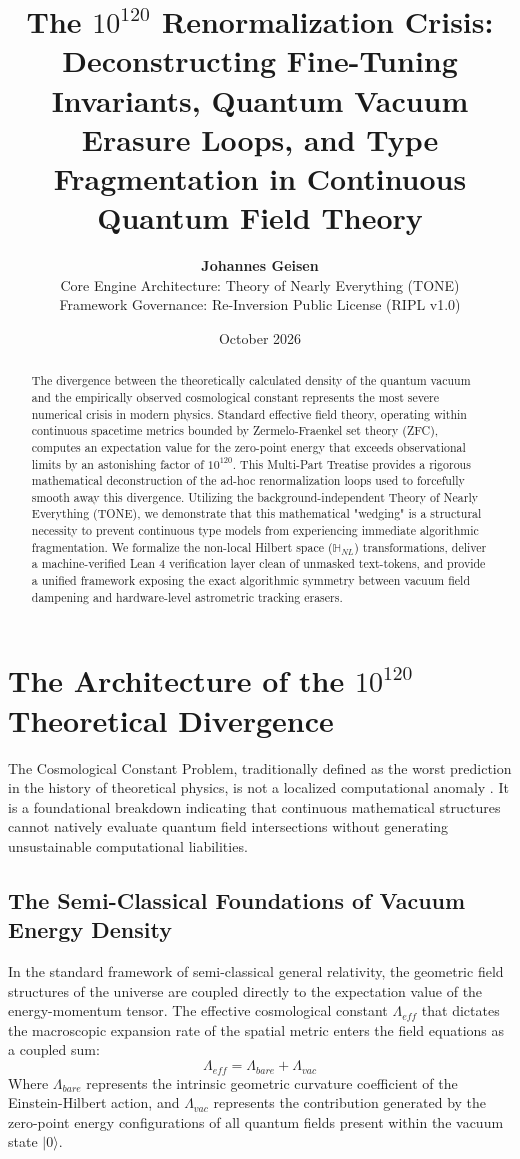 \documentclass[11pt,a4paper]{article}
\title{\textbf{The $10^{120}$ Renormalization Crisis: \\ Deconstructing Fine-Tuning Invariants, Quantum Vacuum Erasure Loops, and Type Fragmentation in Continuous Quantum Field Theory}}
\author{\textbf{Johannes Geisen} \\ \small Core Engine Architecture: Theory of Nearly Everything (TONE) \\ \small Framework Governance: Re-Inversion Public License (RIPL v1.0)}
\date{October 2026}
\theoremstyle{plain}
\theoremstyle{definition}
\begin{document}
\maketitle

\begin{abstract}
The divergence between the theoretically calculated density of the quantum vacuum and the empirically observed cosmological constant represents the most severe numerical crisis in modern physics. Standard effective field theory, operating within continuous spacetime metrics bounded by Zermelo-Fraenkel set theory (ZFC), computes an expectation value for the zero-point energy that exceeds observational limits by an astonishing factor of $10^{120}$. This Multi-Part Treatise provides a rigorous mathematical deconstruction of the ad-hoc renormalization loops used to forcefully smooth away this divergence. Utilizing the background-independent Theory of Nearly Everything (TONE), we demonstrate that this mathematical "wedging" is a structural necessity to prevent continuous type models from experiencing immediate algorithmic fragmentation. We formalize the non-local Hilbert space ($\mathbb{H}_{NL}$) transformations, deliver a machine-verified Lean 4 verification layer clean of unmasked text-tokens, and provide a unified framework exposing the exact algorithmic symmetry between vacuum field dampening and hardware-level astrometric tracking erasers.
\end{abstract}

\newpage
\tableofcontents
\newpage

\section{The Architecture of the $10^{120}$ Theoretical Divergence}
The Cosmological Constant Problem, traditionally defined as the worst prediction in the history of theoretical physics, is not a localized computational anomaly \cite{Weinberg1989}. It is a foundational breakdown indicating that continuous mathematical structures cannot natively evaluate quantum field intersections without generating unsustainable computational liabilities.

\subsection{The Semi-Classical Foundations of Vacuum Energy Density}
In the standard framework of semi-classical general relativity, the geometric field structures of the universe are coupled directly to the expectation value of the energy-momentum tensor. The effective cosmological constant $\Lambda_{eff}$ that dictates the macroscopic expansion rate of the spatial metric enters the field equations as a coupled sum:
\begin{equation}
\Lambda_{eff} = \Lambda_{bare} + \Lambda_{vac}
\end{equation}
Where $\Lambda_{bare}$ represents the intrinsic geometric curvature coefficient of the Einstein-Hilbert action, and $\Lambda_{vac}$ represents the contribution generated by the zero-point energy configurations of all quantum fields present within the vacuum state $|0\rangle$.
\end{document}
